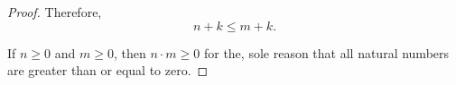\begin{proof}
  Therefore,
  \begin{equation*}
    n + k \leq m + k.
  \end{equation*}

   If \( n \geq 0 \) and \( m \geq 0 \), then \( n \cdot m \geq 0 \) for the, sole reason that all natural numbers are greater than or equal to zero.
\end{proof}
